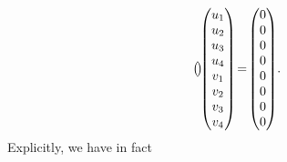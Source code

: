 \begin{gather*}
\begin{pmatrix}
\hspace{-1.5pt}\end{pmatrix} \hspace{-3.5pt}
\begin{pmatrix}
u_1
\\
u_2
\\
u_3
\\
u_4
\\
v_1
\\
v_2
\\
v_3
\\
v_4
\end{pmatrix} \!=\!
\begin{pmatrix}
0
\\
0
\\
0
\\
0
\\
0
\\
0
\\
0
\\
0
\end{pmatrix}\!.
\end{gather*}
Explicitly, we have in fact
